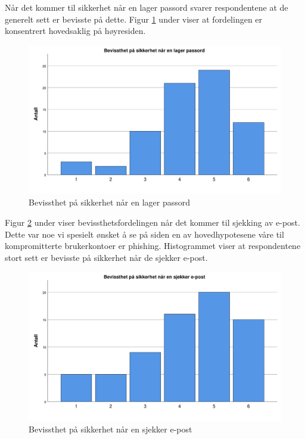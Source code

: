 Når det kommer til sikkerhet når en lager passord svarer respondentene at de generelt sett er bevisste på dette. Figur \ref{fig:case2-bevisst-passord} under viser at fordelingen er konsentrert hovedsaklig på høyresiden.
\begin{figure}[H]
    \centering
    \includegraphics[scale=0.5]{case_2/bilder/spss/bevisst_passord.pdf}
    \caption[Bevisst på sikkerhet med passord]{Bevissthet på sikkerhet når en lager passord}
    \label{fig:case2-bevisst-passord}
\end{figure}

Figur \ref{fig:case2-bevisst-e-post} under viser bevissthetsfordelingen når det kommer til sjekking av e-post. Dette var noe vi spesielt ønsket å se på siden en av hovedhypotesene våre til kompromitterte brukerkontoer er phishing. Histogrammet viser at respondentene stort sett er bevisste på sikkerhet når de sjekker e-post.
\begin{figure}[H]
    \centering
    \includegraphics[scale=0.5]{case_2/bilder/spss/bevisst_e-post.pdf}
    \caption[Bevisst på sikkerhet med e-post]{Bevissthet på sikkerhet når en sjekker e-post}
    \label{fig:case2-bevisst-e-post}
\end{figure}

